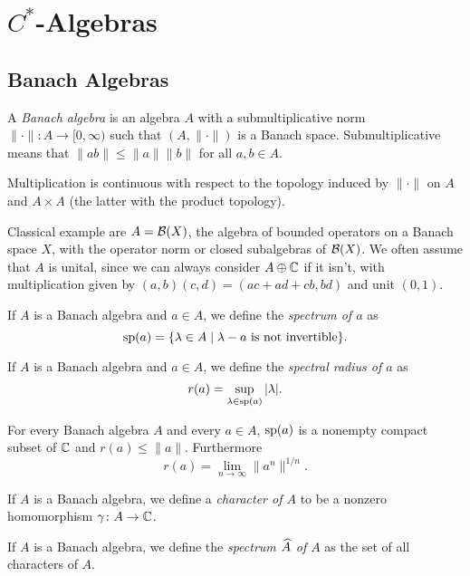 \section{$C^\ast$-Algebras}
\subsection{Banach Algebras}
\begin{definition}
 A \emph{Banach algebra} is an algebra $A$ with a submultiplicative norm $\|\cdot\|\colon A\to [0,\infty)$ such that $(A,\|\cdot\|)$ is a Banach space. Submultiplicative means that $\|ab\|\leq\|a\|\|b\|$ for all $a,b\in A$.
\end{definition}

\begin{exercise}
 Multiplication is continuous with respect to the topology induced by $\|\cdot\|$ on $A$ and $A\times A$ (the latter with the product topology).
\end{exercise}

\noindent Classical example are $A=\B(X)$, the algebra of bounded operators on a Banach space $X$, with the operator norm or closed subalgebras of $\B(X)$. We often assume that $A$ is unital, since we can always consider $A\oplus\C$ if it isn't, with multiplication given by $(a,b)(c,d)=(ac+ad+cb,bd)$ and unit $(0,1)$.

\begin{definition}
 If $A$ is a Banach algebra and $a\in A$, we define the \emph{spectrum of $a$} as $$\sp(a)=\{\lambda\in A\mid \lambda-a\text{ is not invertible}\}.$$ 
\end{definition}
\begin{definition}
 If $A$ is a Banach algebra and $a\in A$, we define the \emph{spectral radius of $a$} as $$r(a)=\sup_{\lambda\in\sp(a)}|\lambda|.$$
\end{definition}

\begin{theorem}
 For every Banach algebra $A$ and every $a\in A$, $\sp(a)$ is a nonempty compact subset of $\C$ and $r(a)\leq\|a\|$. Furthermore $$r(a)=\lim_{n\to\infty}\|a^n\|^{1/n}.$$
\end{theorem}

\begin{definition}
 If $A$ is a Banach algebra, we define a \emph{character of $A$} to be a nonzero homomorphism $\gamma\colon A\to\C$.
\end{definition}
\begin{definition}
 If $A$ is a Banach algebra, we define the \emph{spectrum $\wh{A}$ of $A$} as the set of all characters of $A$.
\end{definition}

